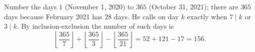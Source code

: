 Number the days $1$ (November 1, 2020) to $365$ (October 31, 2021); there are $365$ days because February 2021 has $28$ days. He calls on day $k$ exactly when $7\mid k$ or $3\mid k$. By inclusion-exclusion the number of such days is
\[\left\lfloor\dfrac{365}{7}\right\rfloor+\left\lfloor\dfrac{365}{3}\right\rfloor-\left\lfloor\dfrac{365}{21}\right\rfloor=52+121-17=\boxed{156}.\]
